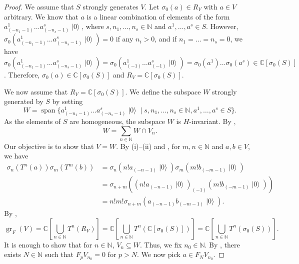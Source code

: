 \documentclass[a4paper, 12pt, reqno]{amsart}
\theoremstyle{remark}
\DeclareMathOperator{\gr}{gr}
\DeclareMathOperator{\vspan}{span}
\DeclareMathOperator{\vac}{|0\rangle}
\begin{document}
\begin{proof}
  We assume that $S$ strongly generates $V$.
  Let $\sigma_0(a) \in R_V$ with $a \in V$ arbitrary.
  We know that $a$ is a linear combination of elements of the form $a^1_{(-n_1 - 1)}\dots a^s_{(-n_s - 1)}\vac$, where $s, n_1, \dots, n_s \in \mathbb{N}$ and $a^1, \dots, a^s \in S$.
  However, $\sigma_0(a^1_{(-n_1 - 1)}\dots a^s_{(-n_s - 1)}\vac) = 0$ if any $n_i > 0$, and if $n_1 = \dots = n_s = 0$, we have $\sigma_0(a^1_{(-n_1 - 1)}\dots a^s_{(-n_s - 1)}\vac) = \sigma_0(a^1_{(-1)}\dots a^s_{(-1)}\vac) = \sigma_0(a^1)\dots\sigma_0(a^s) \in \mathbb{C}[\sigma_0(S)]$.
  Therefore, $\sigma_0(a) \in \mathbb{C}[\sigma_0(S)]$ and $R_V = \mathbb{C}[\sigma_0(S)]$.

  We now assume that $R_V = \mathbb{C}[\sigma_0(S)]$.
  We define the subspace $W$ strongly generated by $S$ by setting
  \begin{equation*}
    W = \vspan\{a^1_{(-n_1 - 1)}\dots a^s_{(-n_s - 1)}\vac \mid s, n_1, \dots, n_s \in \mathbb{N}, a^1, \dots, a^s \in S\}.
  \end{equation*}
  As the elements of $S$ are homogeneous, the subspace $W$ is $H$-invariant.
  By ,
  \begin{equation}
    \label{eq:46}
    W = \sum_{n \in \mathbb{N}}W \cap V_n.
  \end{equation}
  Our objective is to show that $V = W$.
  By (i)--(ii) and , for $m, n \in \mathbb{N}$ and $a, b \in V$, we have
  \begin{align*}
    \sigma_n(T^n(a))\sigma_m(T^m(b)) &= \sigma_n(n!a_{(-n - 1)}\vac)\sigma_m(m!b_{(-m - 1)}\vac) \\
                                     &= \sigma_{n + m}((n!a_{(-n - 1)}\vac)_{(-1)}(m!b_{(-m - 1)}\vac)) \\
                                     &= n!m!\sigma_{n + m}(a_{(-n - 1)}b_{(-m - 1)}\vac).
  \end{align*}
  By ,
  \begin{equation*}
    \gr_F(V) = \mathbb{C}\left[\bigcup_{n \in \mathbb{N}}T^n(R_V)\right] = \mathbb{C}\left[\bigcup_{n \in \mathbb{N}}T^n(\mathbb{C}[\sigma_0(S)])\right] = \mathbb{C}\left[\bigcup_{n \in \mathbb{N}}T^n(\sigma_0(S))\right].
  \end{equation*}
  It is enough to show that for $n \in \mathbb{N}$, $V_n \subseteq W$.
  Thus, we fix $n_0 \in \mathbb{N}$.
  By , there exists $N \in \mathbb{N}$ such that $F_pV_{n_0} = 0$ for $p > N$.
  We now pick $a \in F_NV_{n_0}$.

\end{proof}
\end{document}
